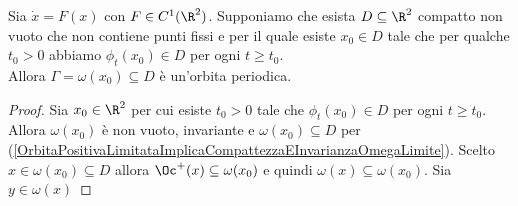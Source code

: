 \begin{theorem}\label{TeoremaPoincareBendixon}
Sia $\dot x=F(x)$ con $F\in C^1(\R^2)$. Supponiamo che esista $D\subseteq \R^2$ compatto non vuoto che non contiene punti fissi e per il quale esiste $x_0\in D$ tale che per qualche $t_0>0$ abbiamo $\phi_t(x_0)\in D$ per ogni $t\geq t_0$.\\
Allora $\Gamma=\omega(x_0)\subseteq D$ \`e un'orbita periodica.
\end{theorem}
\begin{proof}
Sia $x_0\in \R^2$ per cui esiste $t_0>0$ tale che $\phi_t(x_0)\in D$ per ogni $t\geq t_0$. Allora $\omega(x_0)$ \`e non vuoto, invariante e $\omega(x_0)\subseteq D$ per (\ref{OrbitaPositivaLimitataImplicaCompattezzaEInvarianzaOmegaLimite}). Scelto $x\in \omega(x_0)\subseteq D$ allora $\Oc^+(x)\subseteq \omega(x_0)$ e quindi $\omega(x)\subseteq \omega(x_0)$. Sia $y\in \omega(x)$
\vspace{0.25cm}


\end{proof}
